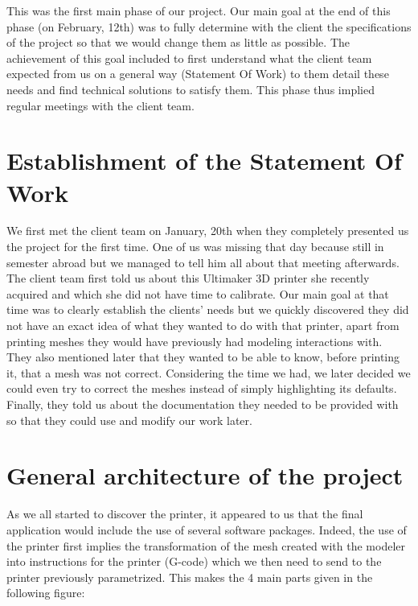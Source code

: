 \documentclass{report}
\begin{document}
This was the first main phase of our project. Our main goal at the end of this phase (on February, 12th) was to fully determine with the client the specifications of the project so that we would change them as little as possible. The achievement of this goal included to first understand what the client team expected from us on a general way (Statement Of Work) to them detail these needs and find technical solutions to satisfy them. This phase thus implied regular meetings with the client team.

\section{Establishment of the Statement Of Work}

We first met the client team on January, 20th when they completely presented us the project for the first time. One of us was missing that day because still in semester abroad but we managed to tell him all about that meeting afterwards.\\

The client team first told us about this Ultimaker 3D printer she recently acquired and which she did not have time to calibrate. Our main goal at that time was to clearly establish the clients' needs but we quickly discovered they did not have an exact idea of what they wanted to do with that printer, apart from printing meshes they would have previously had modeling interactions with.\\

They also mentioned later that they wanted to be able to know, before printing it, that a mesh was not correct. Considering the time we had, we later decided we could even try to correct the meshes instead of simply highlighting its defaults. \\

Finally, they told us about the documentation they needed to be provided with so that they could use and modify our work later. \\

\section{General architecture of the project}

As we all started to discover the printer, it appeared to us that the final application would include the use of several software packages. Indeed, the use of the printer first implies the transformation of the mesh created with the modeler into instructions for the printer (G-code) which we then need to send to the printer previously parametrized. This makes the 4 main parts given in the following figure:
\end{document}
